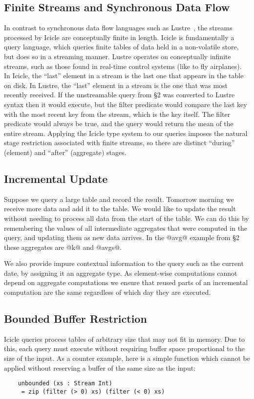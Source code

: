 \subsection{Finite Streams and Synchronous Data Flow}
In contrast to synchronous data flow languages such as {\sc Lustre}~\cite{halbwachs1991synchronous}, the streams processed by Icicle are conceptually finite in length. Icicle is fundamentally a query language, which queries finite tables of data held in a non-volatile store, but does so in a streaming manner. Lustre operates on conceptually infinite streams, such as those found in real-time control systems (like to fly airplanes). In Icicle, the ``last'' element in a stream is the last one that appears in the table on disk. In Lustre, the ``last'' element in a stream is the one that was most recently received. If the unstreamable query from \S2 was converted to Lustre syntax then it would execute, but the filter predicate would compare the last key with the most recent key from the stream, which is the key itself. The filter predicate would always be true, and the query would return the mean of the entire stream. Applying the Icicle type system to our queries imposes the natural stage restriction associated with finite streams, so there are distinct ``during'' (element) and ``after'' (aggregate) stages.


\subsection{Incremental Update}
Suppose we query a large table and record the result. Tomorrow morning we receive more data and add it to the table. We would like to update the result without needing to process all data from the start of the table. We can do this by remembering the values of all intermediate aggregates that were computed in the query, and updating them as new data arrives. In the @avg@ example from \S2 these aggregates are @k@ and @avgs@. 

We also provide impure contextual information to the query such as the current date, by assigning it an aggregate type. As element-wise computations cannot depend on aggregate computations we ensure that reused parts of an incremental computation are the same regardless of which day they are executed.


\subsection{Bounded Buffer Restriction}
\label{icicle:s:IcicleSource:bounded}
Icicle queries process tables of arbitrary size that may not fit in memory. Due to this, each query must execute without requiring buffer space proportional to the size of the input. As a counter example, here is a simple function which cannot be applied without reserving a buffer of the same size as the input:
\begin{lstlisting}
    unbounded (xs : Stream Int)
     = zip (filter (> 0) xs) (filter (< 0) xs)
\end{lstlisting}

